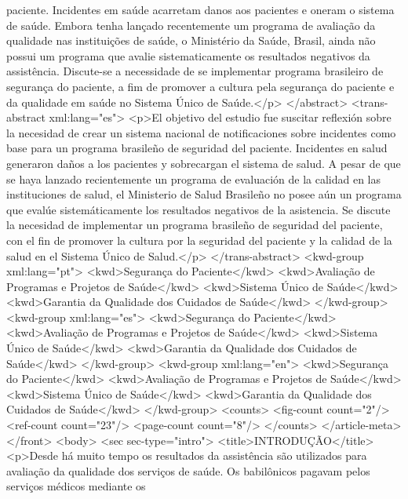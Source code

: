           paciente. Incidentes em saúde acarretam danos aos pacientes e oneram o sistema de saúde.
          Embora tenha lançado recentemente um programa de avaliação da qualidade nas instituições
          de saúde, o Ministério da Saúde, Brasil, ainda não possui um programa que avalie
          sistematicamente os resultados negativos da assistência. Discute-se a necessidade de se
          implementar programa brasileiro de segurança do paciente, a fim de promover a cultura pela
          segurança do paciente e da qualidade em saúde no Sistema Único de Saúde.</p>
      </abstract>
      <trans-abstract xml:lang="es">
        <p>El objetivo del estudio fue suscitar reflexión sobre la necesidad de crear un sistema
          nacional de notificaciones sobre incidentes como base para un programa brasileño de
          seguridad del paciente. Incidentes en salud generaron daños a los pacientes y sobrecargan
          el sistema de salud. A pesar de que se haya lanzado recientemente un programa de
          evaluación de la calidad en las instituciones de salud, el Ministerio de Salud Brasileño
          no posee aún un programa que evalúe sistemáticamente los resultados negativos de la
          asistencia. Se discute la necesidad de implementar un programa brasileño de seguridad del
          paciente, con el fin de promover la cultura por la seguridad del paciente y la calidad de
          la salud en el Sistema Único de Salud.</p>
      </trans-abstract>
      <kwd-group xml:lang="pt">
        <kwd>Segurança do Paciente</kwd>
        <kwd>Avaliação de Programas e Projetos de Saúde</kwd>
        <kwd>Sistema Único de Saúde</kwd>
        <kwd>Garantia da Qualidade dos Cuidados de Saúde</kwd>
      </kwd-group>
      <kwd-group xml:lang="es">
        <kwd>Segurança do Paciente</kwd>
        <kwd>Avaliação de Programas e Projetos de Saúde</kwd>
        <kwd>Sistema Único de Saúde</kwd>
        <kwd>Garantia da Qualidade dos Cuidados de Saúde</kwd>
      </kwd-group>
      <kwd-group xml:lang="en">
        <kwd>Segurança do Paciente</kwd>
        <kwd>Avaliação de Programas e Projetos de Saúde</kwd>
        <kwd>Sistema Único de Saúde</kwd>
        <kwd>Garantia da Qualidade dos Cuidados de Saúde</kwd>
      </kwd-group>
      <counts>
        <fig-count count="2"/>
        <ref-count count="23"/>
        <page-count count="8"/>
      </counts>
    </article-meta>
  </front>
  <body>
    <sec sec-type="intro">
      <title>INTRODUÇÃO</title>
      <p>Desde há muito tempo os resultados da assistência são utilizados para avaliação da
        qualidade dos serviços de saúde. Os babilônicos pagavam pelos serviços médicos mediante os
